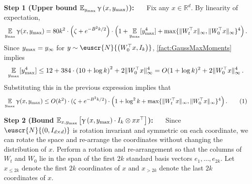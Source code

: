 \documentclass[11pt,letterpaper]{article}
\theoremstyle{plain}
\theoremstyle{definition}
\theoremstyle{remark}
\newcommand{\yesnum}{\addtocounter{equation}{1}\tag{\theequation}}
\newcommand{\sinparen}[1]{\ensuremath{(#1)}}
\newcommand{\sinbrace}[1]{\ensuremath{\{#1\}}}
\newcommand{\inparen}[1]{\ensuremath{\left(#1\right)}}
\newcommand{\insquare}[1]{\ensuremath{\left[#1\right]}}
\newcommand{\snorm}[1]{\ensuremath{\ensuremath{\| #1 \|}}}
\let\norm\relax
\newcommand{\norm}[1]{\ensuremath{\left\lVert #1 \right\rVert}}
\newcommand{\R}{\mathbb{R}}
\newcommand{\E}{\operatornamewithlimits{\mathbb{E}}}
\newcommand{\Ex}{\E}
\newcommand{\customcal}[1]{\euscr{#1}}
\newcommand{\cN}{\customcal{N}}
\renewcommand{\paragraph}[1]{\medskip \noindent\textbf{#1}~}
\renewcommand{\gamma}{\upgamma}
\newcommand{\normal}[2]{\cN{\inparen{#1,#2}}}
\newcommand{\ymax}{y_{\max}}
\begin{document}
{{    \paragraph{Step 1 (Upper bound $\Ex_{\ymax}{
            \gamma\inparen{x,\ymax}
        }$):}~~
        Fix any $x\in \R^d$.
        By linearity of expectation,
        \begin{align*}
            \Ex_{\ymax} \gamma(x,\ymax) 
            = 
                80 k^2\cdot
                \Bigl(\zeta + e^{-B^2 k/2}\Bigr)\cdot
                \Bigl(1 + \Ex_{\ymax}[\ymax^4] + \max\sinbrace{\|W_t^\top x\|_\infty, \|W_0^\top x\|_\infty}^4\Bigr)
                \,.
        \end{align*}
        Since $\ymax = \norm{y}_\infty$ for $y\sim \normal{W_0^\top x}{I_{k}}$, \cref{fact:GaussMaxMoments} implies
        \begin{align*}
            \Ex_{\ymax}[\ymax^4]
            \leq 12 + 384 \cdot \inparen{10+\log{k}}^2 + 2\snorm{W_0^\top x}_\infty^4
            = O\sinparen{1+\log{k}}^2 + 2\snorm{W_0^\top x}_\infty^4
            \,.
        \end{align*}
        Substituting this in the previous expression implies that
        \begin{align*}
            \Ex_{\ymax} \gamma(x,\ymax) 
            \leq 
                O(k^2)\cdot
                (\zeta + e^{-B^2 k/2})\cdot
                \Bigl(1 + \log^2{k} + \max\sinbrace{\|W_t^\top x\|_\infty, \|W_0^\top x\|_\infty}^4\Bigr)
                \,.
                \yesnum\label{eq:SS:LC:step2}
        \end{align*} 
    
    \paragraph{Step 2 (Bound $\Ex_{x,\ymax}\insquare{\gamma\inparen{x,\ymax}\cdot I_{k}\otimes xx^\top }$):}~~
    Since $\normal{0}{I_{d\times d}}$ is rotation invariant and symmetric on each coordinate, we can rotate the space and re-arrange the coordinates without changing the distribution of $x$.
    Perform a rotation and re-arrangement so that the columns of $W_t$ and $W_0$ lie in the span of the first $2k$ standard basis vectors $e_1,\dots,e_{2k}$.
    Let $x_{\leq 2k}$ denote the first $2k$ coordinates of $x$ and $x_{>2k}$ denote the last $2k$ coordinates of $x$.
    

}}
\end{document}
